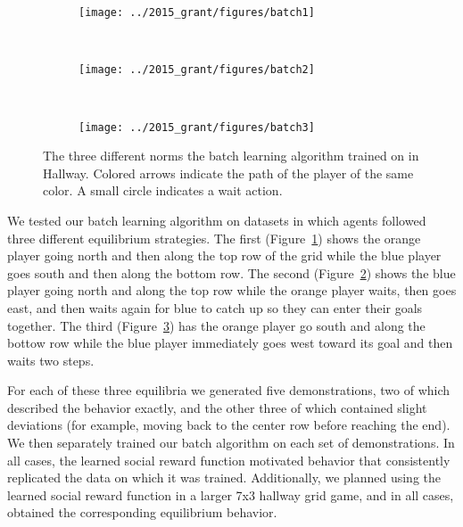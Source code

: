 
\begin{figure}
    \centering
    \begin{subfigure}[b]{0.275\textwidth}
        \texttt{[image: ../2015\_grant/figures/batch1]}
        \caption{}
        \label{fig:batch1}
    \end{subfigure}
\qquad
    ~ %
    \begin{subfigure}[b]{0.275\textwidth}
        \texttt{[image: ../2015\_grant/figures/batch2]}
        \caption{}
        \label{fig:batch2}
    \end{subfigure}
\qquad
    ~ %
    \begin{subfigure}[b]{0.275\textwidth}
        \texttt{[image: ../2015\_grant/figures/batch3]}
        \caption{}
        \label{fig:batch3}
    \end{subfigure}
    \caption{The three different norms the batch learning algorithm trained on in Hallway. Colored arrows indicate the path of the player of the same color. A small circle indicates a wait action.}\label{fig:batchRes}
\end{figure}

We tested our batch learning algorithm on datasets in which
agents followed three different equilibrium strategies. 
The first (Figure~\ref{fig:batch1}) shows the orange player going
north and then along the top row of the grid while the blue player
goes south and then along the bottom row. The second
(Figure~\ref{fig:batch2}) shows the blue player going north and along
the top row while the orange player waits, then goes east, and then
waits again for blue to catch up so they can enter their goals
together.  The third (Figure~\ref{fig:batch3}) has the orange player
go south and along the bottow row while the blue player immediately
goes west toward its goal and then waits two steps.

For each of these three equilibria we generated five demonstrations,
two of which described the behavior exactly, and the other three of
which contained slight deviations (for example, moving back to the
center row before reaching the end). We then separately trained our
batch algorithm on each set of demonstrations. In all cases, the
learned social reward function motivated behavior that consistently
replicated the data on which it was trained. Additionally, we planned
using the learned social reward function in a larger 7x3 hallway grid
game, and in all cases, obtained the corresponding equilibrium behavior.

